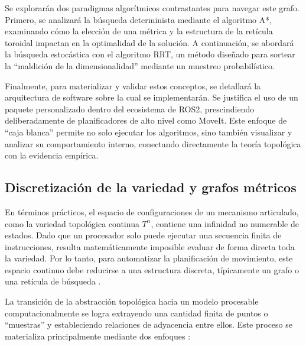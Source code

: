 Se explorarán dos paradigmas algorítmicos contrastantes para navegar este grafo. Primero, se 
analizará la búsqueda determinista mediante el algoritmo A*, examinando cómo la elección de una 
métrica y la estructura de la retícula toroidal impactan en la optimalidad de la solución. A 
continuación, se abordará la búsqueda estocástica con el algoritmo RRT, un método diseñado para 
sortear la \enquote{maldición de la dimensionalidad} mediante un muestreo probabilístico.

Finalmente, para materializar y validar estos conceptos, se detallará la arquitectura de software 
sobre la cual se implementarán. Se justifica el uso de un paquete personalizado dentro del ecosistema 
de ROS2, prescindiendo deliberadamente de planificadores de alto nivel como MoveIt. Este enfoque de 
\enquote{caja blanca} permite no solo ejecutar los algoritmos, sino también visualizar y analizar su 
comportamiento interno, conectando directamente la teoría topológica con la evidencia empírica.

\subsection{Discretización de la variedad y grafos métricos}

En términos prácticos, el espacio de configuraciones de un mecanismo articulado, 
como la variedad topológica continua $T^n$, contiene una infinidad no numerable 
de estados. Dado que un procesador solo puede ejecutar una secuencia 
finita de instrucciones, resulta matemáticamente imposible evaluar de forma 
directa toda la variedad. Por lo tanto, para automatizar la planificación 
de movimiento, este espacio continuo debe reducirse a una estructura discreta, 
típicamente un grafo o una retícula de búsqueda \parencite{lavalle2006planning}.

La transición de la abstracción topológica hacia un modelo procesable 
computacionalmente se logra extrayendo una cantidad finita de puntos o 
\enquote{muestras} y estableciendo relaciones de adyacencia entre ellos. 
Este proceso se materializa principalmente mediante dos enfoques \parencite{lavalle2006planning}:


